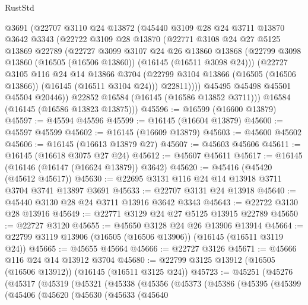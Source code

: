 \begin{lexlean}{RustStd}
\begin{coremodule}
        @3691
        (@22707
          @3110
          @24
          @13872
          (@45440
            @3109
            @28
            @24
            @3711
            @13870
            @3642
            @3343
            (@22722
              @3109
              @28
              @13870
              (@22771
                @3108
                @24
                @27
                @5125
                @13869
                @22789
                (@22727
                  @3099
                  @3107
                  @24
                  @26
                  @13860
                  @13868
                  (@22799 @3098 @13860 (@16505 (@16506 @13860)) (@16145 (@16511 @3098 @24)))
                  (@22727
                    @3105
                    @116
                    @24
                    @14
                    @13866
                    @3704
                    (@22799 @3104 @13866 (@16505 (@16506 @13866)) (@16145 (@16511 @3104 @24)))
                    @22811))))
            @45495
            @45498
            @45501
            @45504
            @20446))
        @22852
        @16584
        (@16145 (@16586 @13852 @3711)))
      @16584
      (@16145 (@16586 @13823 @13875)))
@45596 := @16599 (@16600 @13879)
@45597 := @45594 @45596
@45599 := @16145 (@16604 @13879)
@45600 := @45597 @45599
@45602 := @16145 (@16609 @13879)
@45603 := @45600 @45602
@45606 := @16145 (@16613 @13879 @27)
@45607 := @45603 @45606
@45611 := @16145 (@16618 @3075 @27 @24)
@45612 := @45607 @45611
@45617 := @16145 (@16146 (@16147 (@16624 @13879)) @3642)
@45620 := @45416 (@45420 (@45612 @45617))
@45630 := @22695 @3131 @116 @24 @14 @13918 @3711 @3704 @3741 @13897 @3691
@45633 := @22707 @3131 @24 @13918
@45640 := @45440 @3130 @28 @24 @3711 @13916 @3642 @3343
@45643 := @22722 @3130 @28 @13916
@45649 := @22771 @3129 @24 @27 @5125 @13915 @22789
@45650 := @22727 @3120
@45655 := @45650 @3128 @24 @26 @13906 @13914
@45664 := @22799 @3119 @13906 (@16505 (@16506 @13906)) (@16145 (@16511 @3119 @24))
@45665 := @45655 @45664
@45666 := @22727 @3126
@45671 := @45666 @116 @24 @14 @13912 @3704
@45680 := @22799 @3125 @13912 (@16505 (@16506 @13912)) (@16145 (@16511 @3125 @24))
@45723 := @45251
    (@45276
      (@45317
        (@45319
          (@45321
            (@45338
              (@45356
                (@45373
                  (@45386
                    (@45395
                      (@45399
                        (@45406
                          (@45620
                            (@45630
                              (@45633
                                (@45640

\end{coremodule}
\end{lexlean}
